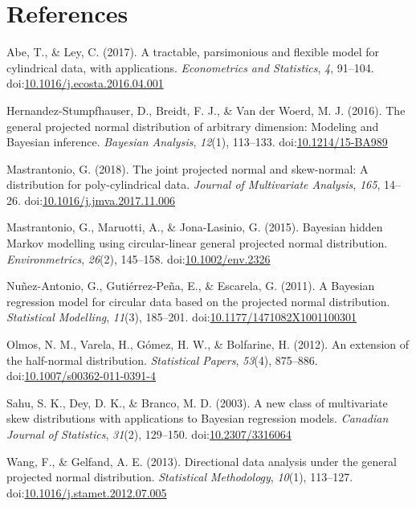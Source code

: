 \documentclass[12pt,]{article}
\DeclareRobustCommand{\VANDER}[3]{#2}
\begin{document}
\section*{References}

\hypertarget{refs}{}
\leavevmode\hypertarget{ref-abe2017tractable}{}%
Abe, T., \& Ley, C. (2017). A tractable, parsimonious and flexible model
for cylindrical data, with applications. \emph{Econometrics and
Statistics}, \emph{4}, 91--104.
doi:\href{https://doi.org/10.1016/j.ecosta.2016.04.001}{10.1016/j.ecosta.2016.04.001}

\leavevmode\hypertarget{ref-hernandez2016general}{}%
Hernandez-Stumpfhauser, D., Breidt, F. J., \&
\VANDER{Woerd}{Van der}{van der} Woerd, M. J. (2016). The general
projected normal distribution of arbitrary dimension: Modeling and
Bayesian inference. \emph{Bayesian Analysis}, \emph{12}(1), 113--133.
doi:\href{https://doi.org/10.1214/15-BA989}{10.1214/15-BA989}

\leavevmode\hypertarget{ref-mastrantonio2018joint}{}%
Mastrantonio, G. (2018). The joint projected normal and skew-normal: A
distribution for poly-cylindrical data. \emph{Journal of Multivariate
Analysis}, \emph{165}, 14--26.
doi:\href{https://doi.org/10.1016/j.jmva.2017.11.006}{10.1016/j.jmva.2017.11.006}

\leavevmode\hypertarget{ref-mastrantonio2015bayesian}{}%
Mastrantonio, G., Maruotti, A., \& Jona-Lasinio, G. (2015). Bayesian
hidden Markov modelling using circular-linear general projected normal
distribution. \emph{Environmetrics}, \emph{26}(2), 145--158.
doi:\href{https://doi.org/10.1002/env.2326}{10.1002/env.2326}

\leavevmode\hypertarget{ref-nunez2011bayesian}{}%
Nuñez-Antonio, G., Gutiérrez-Peña, E., \& Escarela, G. (2011). A
Bayesian regression model for circular data based on the projected
normal distribution. \emph{Statistical Modelling}, \emph{11}(3),
185--201.
doi:\href{https://doi.org/10.1177/1471082X1001100301}{10.1177/1471082X1001100301}

\leavevmode\hypertarget{ref-olmos2012extension}{}%
Olmos, N. M., Varela, H., Gómez, H. W., \& Bolfarine, H. (2012). An
extension of the half-normal distribution. \emph{Statistical Papers},
\emph{53}(4), 875--886.
doi:\href{https://doi.org/10.1007/s00362-011-0391-4}{10.1007/s00362-011-0391-4}

\leavevmode\hypertarget{ref-sahu2003new}{}%
Sahu, S. K., Dey, D. K., \& Branco, M. D. (2003). A new class of
multivariate skew distributions with applications to Bayesian regression
models. \emph{Canadian Journal of Statistics}, \emph{31}(2), 129--150.
doi:\href{https://doi.org/10.2307/3316064}{10.2307/3316064}

\leavevmode\hypertarget{ref-wang2012directional}{}%
Wang, F., \& Gelfand, A. E. (2013). Directional data analysis under the
general projected normal distribution. \emph{Statistical Methodology},
\emph{10}(1), 113--127.
doi:\href{https://doi.org/10.1016/j.stamet.2012.07.005}{10.1016/j.stamet.2012.07.005}
\end{document}
